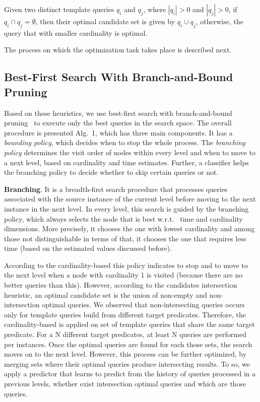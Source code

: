 \begin{definition} Given two distinct template queries $q_i$ and $q_j$, where $|q_i| > 0$ and $|q_j| > 0$,  if $q_i \cap q_j = \emptyset$, then their optimal candidate set is given by $q_i \cup q_j$, otherwise, the query that with smaller cardinality is optimal.
\end{definition}  

The process on which the optimization task takes place is described next.

\subsection{Best-First Search With Branch-and-Bound Pruning} 
 
Based on these heuristics, we use best-first search with branch-and-bound pruning~\cite{DBLP:journals/jacm/DechterP85} to execute only the best queries in the search space. The overall procedure is presented Alg.~1, which has three main components. It has a \emph{bounding policy}, which decides when to stop the whole process. The \emph{branching policy} determines the visit order of nodes within every level and when to move to a next level, based on cardinality and time estimates. Further, a classifier helps the branching policy to decide whether to skip certain queries or not. 

\textbf{Branching}. It is a breadth-first search procedure that processes queries associated with the source instance of the current level before moving to the next instance in the next level. In every level, this search is guided by the branching policy, which always selects the node that is best w.r.t.~ time and cardinality dimensions. More precisely, it chooses the one with lowest cardinality and among those not distinguishable in terms of that, it chooses the one that requires less time (based on the estimated values discussed before). 

According to the cardinality-based  this policy indicates to stop and to move to the next level when a node with cardinality 1 is visited (because there are no better queries than this).  However, according to the candidates intersection heuristic, an optimal candidate set is the union of non-empty and non-intersection optimal queries. We observed that non-intersecting queries occurs only for template queries build from different target predicates. Therefore, the cardinality-based is applied on set of template queries that share the same target predicate. For a N different target predicates, at least N queries are performed per instances. Once the optimal queries are found for each those sets, the search moves on to the next level. However, this process can be further optimized, by merging sets where their optimal queries produce intersecting results. To so, we apply a predictor that learns to predict from the history of queries processed in a previous levels, whether exist intersection optimal queries and which are those queries. 

